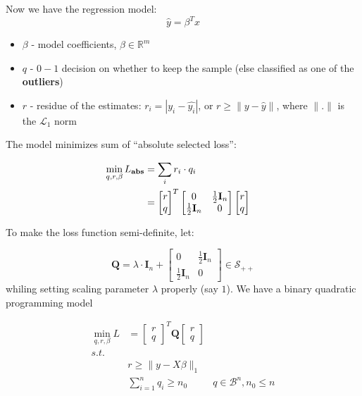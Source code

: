 \documentclass[
  10pt,
  a4paper,
,tablecaptionabove
]{scrartcl}
\providecommand{\tightlist}{%
  \setlength{\itemsep}{0pt}\setlength{\parskip}{0pt}}
\begin{document}
Now we have the regression model: \[\hat{y} = \beta^Tx\]

\begin{itemize}
\tightlist
\item
  \(\beta\) - model coefficients, \(\beta \in \mathbb{R}^m\)
\item
  \(q\) - \(0-1\) decision on whether to keep the sample (else
  classified as one of the \textbf{outliers})
\item
  \(r\) - residue of the estimates: \(r_i = |y_i - \hat{y_i}|\), or
  \(r \ge \|y-\hat{y}\|\), where \(\|.\|\) is the \(\mathcal{L}_1\) norm
\end{itemize}

The model minimizes sum of ``absolute selected loss'':

\[\begin{aligned}\min_{q,r,\beta} L_{\bf abs} &= \sum_i r_i\cdot q_i \\
 &=\begin{bmatrix} r\\q \end{bmatrix}^T\begin{bmatrix} 0 & \frac{1}{2}\mathbf{I}_n\\  \frac{1}{2}\mathbf{I}_n &0 \end{bmatrix}\begin{bmatrix} r\\q \end{bmatrix} & \end{aligned}\]

To make the loss function semi-definite, let:

\[\mathbf{Q} = \lambda\cdot \mathbf{I}_n + \begin{bmatrix} 0 & \frac{1}{2}\mathbf{I}_n\\  \frac{1}{2}\mathbf{I}_n &0 \end{bmatrix} \in \mathcal{S}_{++}\]
whiling setting scaling parameter \(\lambda\) properly (say \(1\)). We
have a binary quadratic programming model

\[\begin{aligned}\min_{q,r,\beta} L &=\begin{bmatrix} r\\q \end{bmatrix}^T\mathbf{Q}\begin{bmatrix} r\\q \end{bmatrix} \\ s.t. &\\ &r \ge \|y-X\beta\|_1\\ & \sum_{i=1}^n q_i \ge n_0 &q \in \mathcal{B}^n, n_0 \le n \\\end{aligned}\]
\end{document}
